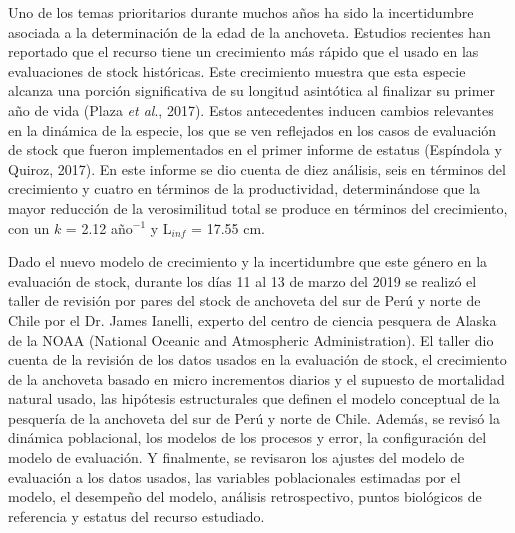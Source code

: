 \documentclass[letter,11pt]{article}
\begin{document}
Uno de los temas prioritarios durante muchos a\~{n}os ha sido la
incertidumbre asociada a la determinaci\'on de la edad de la anchoveta.
Estudios recientes han reportado que el recurso tiene un crecimiento m\'as
r\'apido que el usado en las evaluaciones de stock hist\'oricas. Este
crecimiento muestra que esta especie alcanza una porci\'on significativa
de su longitud asint\'otica al finalizar su primer a\~{n}o de vida (Plaza
\textit{et al}., 2017). Estos antecedentes inducen cambios relevantes en
la din\'amica de la especie, los que se ven reflejados en los casos de
evaluaci\'on de stock que fueron implementados en el primer informe de
estatus (Esp\'indola y Quiroz, 2017). En este informe se dio cuenta de
diez an\'alisis, seis en t\'erminos del crecimiento y cuatro en t\'erminos de
la productividad, determin\'andose que la mayor reducci\'on de la
verosimilitud total se produce en t\'erminos del crecimiento, con un
$k$ = 2.12 a\~{n}o$^{-1}$ y L$_{inf}$ = 17.55 cm.

Dado el nuevo modelo de crecimiento y la incertidumbre que este g\'enero
en la evaluaci\'on de stock, durante los d\'ias 11 al 13 de marzo del 2019
se realiz\'o el taller de revisi\'on por pares del stock de anchoveta del
sur de Per\'u y norte de Chile por el Dr. James Ianelli, experto del
centro de ciencia pesquera de Alaska de la NOAA (National Oceanic and
Atmospheric Administration). El taller dio cuenta de la revisi\'on de los
datos usados en la evaluaci\'on de stock, el crecimiento de la anchoveta
basado en micro incrementos diarios y el supuesto de mortalidad natural
usado, las hip\'otesis estructurales que definen el modelo conceptual de
la pesquer\'ia de la anchoveta del sur de Per\'u y norte de Chile. Adem\'as,
se revis\'o la din\'amica poblacional, los modelos de los procesos y error,
la configuraci\'on del modelo de evaluaci\'on. Y finalmente, se revisaron
los ajustes del modelo de evaluaci\'on a los datos usados, las variables
poblacionales estimadas por el modelo, el desempe\~{n}o del modelo, an\'alisis
retrospectivo, puntos biol\'ogicos de referencia y estatus del recurso
estudiado.
\end{document}
